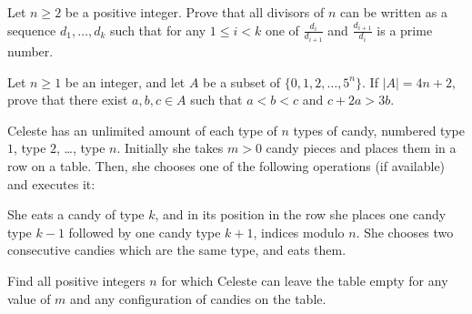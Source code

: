 
\begin{problem}
Let $n\geq 2$ be a positive integer.
Prove that all divisors of $n$ can be written as a sequence $d_1,\dots,d_k$ such that
for any $1\leq i<k$ one of $\frac{d_i}{d_{i+1}}$ and $\frac{d_{i+1}}{d_i}$ is a prime number.
\end{problem} 



\begin{problem}
Let $n \ge 1$ be an integer,
and let $A$ be a subset of $\{0,1,2,\dots,5^n\}$.
If $|A|=4n+2$, prove that there exist $a,b,c \in A$
such that $a < b < c$ and $c+2a > 3b$.
\end{problem} 



\begin{reqproblem}
	Celeste has an unlimited amount of each type of $n$ types of candy,
	numbered type $1$, type $2$, \dots, type $n$.
	Initially she takes $m>0$ candy pieces and places them in a row on a table.
	Then, she chooses one of the following operations (if available) and executes it:
	\begin{itemize}
		\ii She eats a candy of type $k$, and in its position in the row she
		places one candy type $k-1$ followed by one candy type $k+1$, indices modulo $n$.
		\ii She chooses two consecutive candies which are the same type, and eats them.
	\end{itemize}
	Find all positive integers $n$ for which Celeste can
	leave the table empty for any value of $m$
	and any configuration of candies on the table.
\end{reqproblem} 


